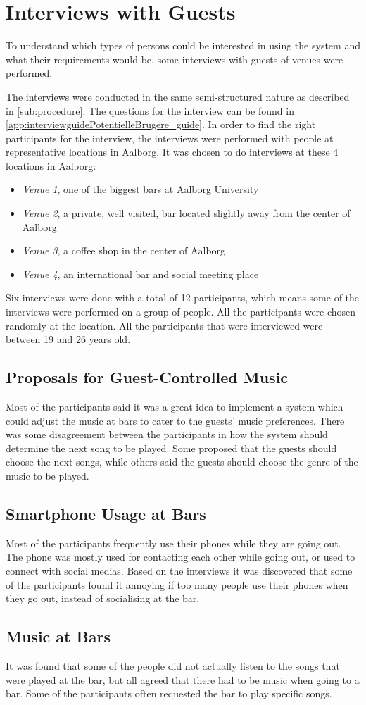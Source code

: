 \section{Interviews with Guests}
\label{userInterviews}

To understand which types of persons could be interested in using the system and what their requirements would be, some interviews with guests of venues were performed.

The interviews were conducted in the same semi-structured nature as described in \cref{sub:procedure}. The questions for the interview can be found in \cref{app:interviewguidePotentielleBrugere_guide}. In order to find the right participants for the interview, the interviews were performed with people at representative locations in Aalborg. It was chosen to do interviews at these 4 locations in Aalborg:

\begin{itemize}
    \item \emph{Venue 1}, one of the biggest bars at Aalborg University
    \item \emph{Venue 2}, a private, well visited, bar located slightly away from the center of Aalborg
    \item \emph{Venue 3}, a coffee shop in the center of Aalborg
    \item \emph{Venue 4}, an international bar and social meeting place
\end{itemize}

Six interviews were done with a total of 12 participants, which means
some of the interviews were performed on a group of people. All the
participants were chosen randomly at the location. All the participants that were interviewed were between 19 and 26 years old.

\subsection{Proposals for Guest-Controlled Music}
Most of the participants said it was a great idea to implement a system which could adjust the music at bars to cater to the guests' music preferences. There was some disagreement between the participants in how the system should determine the next song to be played. Some proposed that the guests should choose the next songs, while others said the guests should choose the genre of the music to be played.

\subsection{Smartphone Usage at Bars}
Most of the participants frequently use their phones while they are going out. The phone was mostly used for contacting each other while going out, or used to connect with social medias.
Based on the interviews it was discovered that some of the participants found it annoying if too many people use their phones when they go out, instead of socialising at the bar.

\subsection{Music at Bars}
It was found that some of the people did not actually listen to the songs that were played at the bar, but all agreed that there had to be music when going to a bar. Some of the participants often requested the bar to play specific songs.
